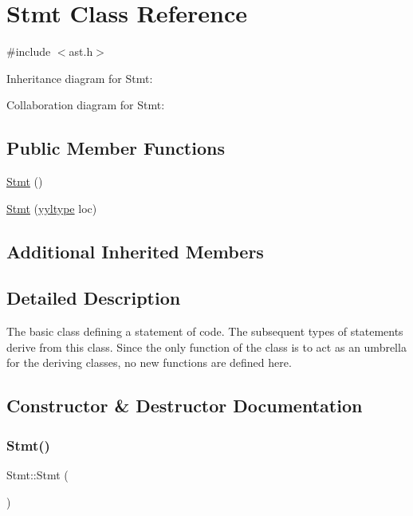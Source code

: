 \hypertarget{class_stmt}{}\section{Stmt Class Reference}
\label{class_stmt}


{\ttfamily \#include $<$ast.\+h$>$}



Inheritance diagram for Stmt\+:


Collaboration diagram for Stmt\+:
\subsection*{Public Member Functions}
\begin{DoxyCompactItemize}
\item 
\hyperlink{class_stmt_a9287b413e13fffa1f002528d2567257b}{Stmt} ()
\item 
\hyperlink{class_stmt_af71ea596ea1f0db2ebeb7e16241544c5}{Stmt} (\hyperlink{structyyltype}{yyltype} loc)
\end{DoxyCompactItemize}
\subsection*{Additional Inherited Members}


\subsection{Detailed Description}
The basic class defining a statement of code. The subsequent types of statements derive from this class. Since the only function of the class is to act as an umbrella for the deriving classes, no new functions are defined here. 

\subsection{Constructor \& Destructor Documentation}
\mbox{\label{class_stmt_a9287b413e13fffa1f002528d2567257b}} 
\subsubsection{\texorpdfstring{Stmt()}{Stmt()}\hspace{0.1cm}{\footnotesize\ttfamily [1/2]}}
{\footnotesize\ttfamily Stmt\+::\+Stmt (\begin{DoxyParamCaption}{ }\end{DoxyParamCaption})\hspace{0.3cm}{\ttfamily [inline]}}

